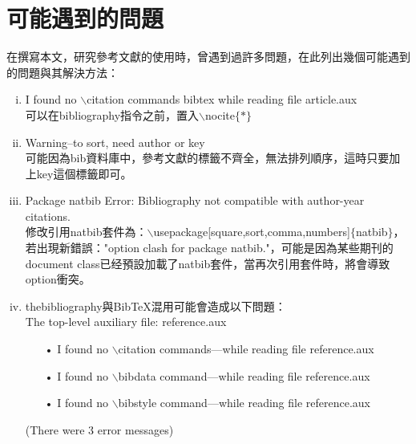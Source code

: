 	
\section{{\UD 可能遇到的問題}}	 
	在撰寫本文，研究參考文獻的使用時，曾遇到過許多問題，在此列出幾個可能遇到的問題與其解決方法：
\begin{enumerate}[i. ]
\item I found no $\backslash$citation commands bibtex while reading file article.aux \\
	可以在bibliography指令之前，置入$\backslash$nocite$\{*\}$
\item Warning--to sort, need author or key \\
	可能因為bib資料庫中，參考文獻的標籤不齊全，無法排列順序，這時只要加上key這個標籤即可。
\item Package natbib Error: Bibliography not compatible with author-year citations. \\
	修改引用natbib套件為：$\backslash$usepackage[square,sort,comma,numbers]$\{$natbib$\}$，若出現新錯誤："option clash for package natbib."，可能是因為某些期刊的document class已经預設加載了natbib套件，當再次引用套件時，將會導致option衝突。
\item thebibliography與BibTeX混用可能會造成以下問題： \\
	The top-level auxiliary file: reference.aux
	\begin{itemize}
	\item[•]  I found no $\backslash$citation commands---while reading file reference.aux 
    \item[•]  I found no $\backslash$bibdata command---while reading file reference.aux 
    \item[•]  I found no $\backslash$bibstyle command---while reading file reference.aux 
	\end{itemize}
 	(There were 3 error messages)
\end{enumerate}


\nocite{*}


	

